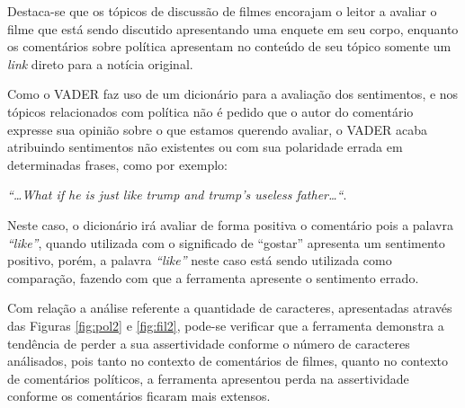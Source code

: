 Destaca-se que os tópicos de discussão de filmes encorajam o leitor a avaliar o
filme que está sendo discutido apresentando uma enquete em seu corpo, enquanto
os comentários sobre política apresentam no conteúdo de seu tópico somente um
\textit{link} direto para a notícia original. 

Como o \ac{VADER} faz uso de um
dicionário para a avaliação dos sentimentos, e nos tópicos relacionados com
política não é pedido que o autor do comentário expresse sua opinião sobre o
que estamos querendo avaliar, o \ac{VADER} acaba atribuindo sentimentos não
existentes ou com sua polaridade errada em determinadas frases, como por
exemplo: 

\textit{``\ldots What if he is just like trump and trump's useless
father\ldots``}. 

Neste caso, o dicionário irá avaliar de forma positiva o
comentário pois a palavra \textit{``like''}, quando utilizada com o significado
de ``gostar'' apresenta um sentimento positivo, porém, a palavra
\textit{``like''} neste caso está sendo utilizada como comparação, fazendo com
que a ferramenta apresente o sentimento errado.

Com relação a análise referente a quantidade de caracteres, apresentadas através
das Figuras \ref{fig:pol2} e \ref{fig:fil2}, pode-se verificar que a ferramenta
demonstra a tendência de perder a sua assertividade conforme o número de
caracteres análisados, pois tanto no contexto de comentários de filmes, quanto
no contexto de comentários políticos, a ferramenta apresentou perda na
assertividade conforme os comentários ficaram mais extensos.
